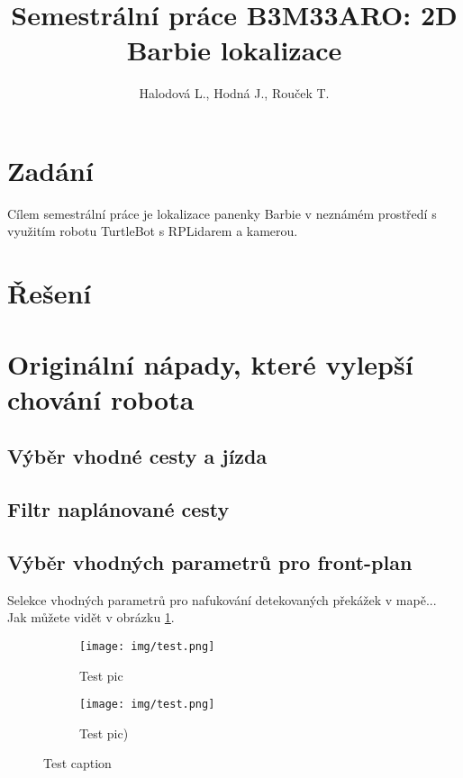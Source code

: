 \documentclass[twoside]{article}
\begin{document}
\author{Halodová L., Hodná J., Rouček T.}
\title{Semestrální práce B3M33ARO: 2D Barbie lokalizace}
\maketitle

\section{Zadání}
Cílem semestrální práce je lokalizace panenky Barbie v neznámém prostředí s využitím robotu TurtleBot s RPLidarem a kamerou.
\section{Řešení}

\section{Originální nápady, které vylepší chování robota}
\subsection{Výběr vhodné cesty a jízda}
\subsection{Filtr naplánované cesty}
\subsection{Výběr vhodných parametrů pro front-plan}
	Selekce vhodných parametrů pro nafukování detekovaných překážek v mapě...\\
	Jak můžete vidět v obrázku \ref{fig:front_plan}.
	\begin{figure}[!h]
     \centering
     \begin{subfigure}[b]{0.45\textwidth}
         \centering
         \texttt{[image: img/test.png]}
         \caption{Test pic}
     \end{subfigure}
     \begin{subfigure}[b]{0.45\textwidth}
         \centering
         \texttt{[image: img/test.png]}
         \caption{Test pic)}
         
     \end{subfigure}
        \caption{Test caption}
        \label{fig:front_plan}
	\end{figure}
\end{document}
